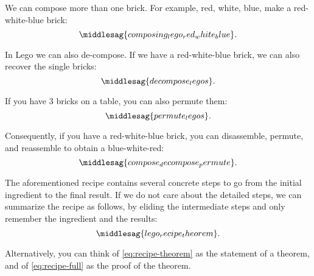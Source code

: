 We can compose more than one brick.
For example, red, white, blue, make a red-white-blue brick:
%
\begin{equation}
	\middlesag{composing_lego_red_white_blue}.
\end{equation}

In Lego we can also de-compose.
If we have a red-white-blue brick, we can also recover the single bricks:
%
\begin{equation}
	\middlesag{decompose_legos}.
\end{equation}

If you have 3 bricks on a table, you can also permute them:
%
\begin{equation}
	\middlesag{permute_legos}.
\end{equation}

Consequently, if you have a red-white-blue brick, you can disassemble, permute, and reassemble to obtain a blue-white-red:
%
\begin{equation}
	\label{eq:recipe-full}
	\middlesag{compose_decompose_permute}.
\end{equation}

The aforementioned recipe contains several concrete steps to go from the initial ingredient to the final result.
If we do not care about the detailed steps, we can summarize the recipe as follows, by eliding the intermediate steps and only remember the ingredient and the results:
%
\begin{equation}
	\label{eq:recipe-theorem}
	\middlesag{lego_recipe_theorem}.
\end{equation}

Alternatively, you can think of \cref{eq:recipe-theorem} as the statement of a theorem, and of \cref{eq:recipe-full} as the proof of the theorem.

